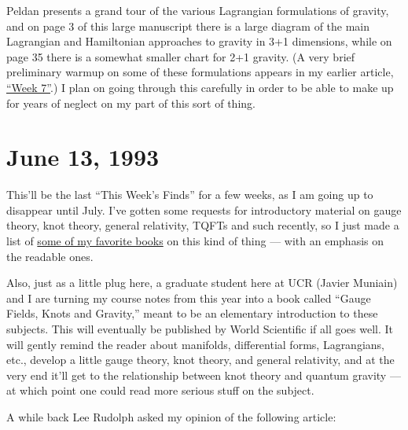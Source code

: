 \documentclass{article}
\def\tightlist{}
\renewcommand{\texttt}[1]{%
  \begingroup
  \ttfamily
  \begingroup\lccode`~=`/\lowercase{\endgroup\def~}{/\discretionary{}{}{}}%
  \begingroup\lccode`~=`[\lowercase{\endgroup\def~}{[\discretionary{}{}{}}%
  \begingroup\lccode`~=`.\lowercase{\endgroup\def~}{.\discretionary{}{}{}}%
  \catcode`/=\active\catcode`[=\active\catcode`.=\active
  \scantokens{#1\noexpand}%
  \endgroup
}
\begin{document}
Peldan presents a grand tour of the various Lagrangian formulations of
gravity, and on page 3 of this large manuscript there is a large diagram
of the main Lagrangian and Hamiltonian approaches to gravity in 3+1
dimensions, while on page 35 there is a somewhat smaller chart for 2+1
gravity. (A very brief preliminary warmup on some of these formulations
appears in my earlier article, \protect\hyperlink{week7}{``Week 7''}.) I
plan on going through this carefully in order to be able to make up for
years of neglect on my part of this sort of thing.



\hypertarget{week17}{%
\section{June 13, 1993}\label{week17}}

This'll be the last ``This Week's Finds'' for a few weeks, as I am going
up to disappear until July. I've gotten some requests for introductory
material on gauge theory, knot theory, general relativity, TQFTs and
such recently, so I just made a list of
\href{http://math.ucr.edu/home/baez/books.html}{some of my favorite
books} on this kind of thing --- with an emphasis on the readable ones.

Also, just as a little plug here, a graduate student here at UCR (Javier
Muniain) and I are turning my course notes from this year into a book
called ``Gauge Fields, Knots and Gravity,'' meant to be an elementary
introduction to these subjects. This will eventually be published by
World Scientific if all goes well. It will gently remind the reader
about manifolds, differential forms, Lagrangians, etc., develop a little
gauge theory, knot theory, and general relativity, and at the very end
it'll get to the relationship between knot theory and quantum gravity
--- at which point one could read more serious stuff on the subject.

A while back Lee Rudolph asked my opinion of the following article:

\end{document}
